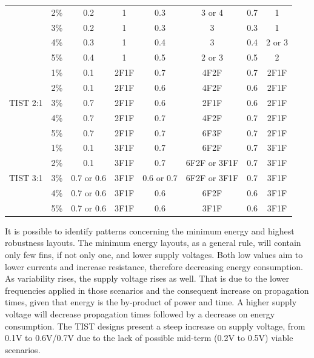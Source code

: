 \documentclass[pgmicro,mestrado,english]{iiufrgs}
\begin{document}
\begin{table}[]
{\begin{tabular}{|c|c|c|c|c|c|c|c|}
                          & 2\% & 0.2        & 1      & 0.3        & 3 or 4       & 0.7        & 1      \\ \cline{2-8}
                          & 3\% & 0.2        & 1      & 0.3        & 3            & 0.3        & 1      \\ \cline{2-8}
                          & 4\% & 0.3        & 1      & 0.4        & 3            & 0.4        & 2 or 3 \\ \cline{2-8}
                          & 5\% & 0.4        & 1      & 0.5        & 2 or 3       & 0.5        & 2      \\ \hline
\multirow{5}{*}{TIST 2:1} & 1\% & 0.1        & 2F1F   & 0.7        & 4F2F         & 0.7        & 2F1F   \\ \cline{2-8}
                          & 2\% & 0.1        & 2F1F   & 0.6        & 4F2F         & 0.6        & 2F1F   \\ \cline{2-8}
                          & 3\% & 0.7        & 2F1F   & 0.6        & 2F1F         & 0.6        & 2F1F   \\ \cline{2-8}
                          & 4\% & 0.7        & 2F1F   & 0.7        & 4F2F         & 0.7        & 2F1F   \\ \cline{2-8}
                          & 5\% & 0.7        & 2F1F   & 0.7        & 6F3F         & 0.7        & 2F1F   \\ \hline
\multirow{5}{*}{TIST 3:1} & 1\% & 0.1        & 3F1F   & 0.7        & 6F2F         & 0.7        & 3F1F   \\ \cline{2-8}
                          & 2\% & 0.1        & 3F1F   & 0.7        & 6F2F or 3F1F & 0.7        & 3F1F   \\ \cline{2-8}
                          & 3\% & 0.7 or 0.6 & 3F1F   & 0.6 or 0.7 & 6F2F or 3F1F & 0.7        & 3F1F   \\ \cline{2-8}
                          & 4\% & 0.7 or 0.6 & 3F1F   & 0.6        & 6F2F         & 0.6        & 3F1F   \\ \cline{2-8}
                          & 5\% & 0.7 or 0.6 & 3F1F   & 0.6        & 3F1F         & 0.6        & 3F1F   \\ \hline
\end{tabular}
}
\end{table}

	It is possible to identify patterns concerning the minimum energy and highest robustness layouts. The minimum energy layouts, as a general rule, will contain only few fins, if not only one, and lower supply voltages. Both low values aim to lower currents and increase resistance, therefore decreasing energy consumption. As variability rises, the supply voltage rises as well. That is due to the lower frequencies applied in those scenarios and the consequent increase on propagation times, given that energy is the by-product of power and time. A higher supply voltage will decrease propagation times followed by a decrease on energy consumption. The TIST designs present a steep increase on supply voltage, from 0.1V to 0.6V/0.7V due to the lack of possible mid-term (0.2V to 0.5V) viable scenarios.
\end{document}
